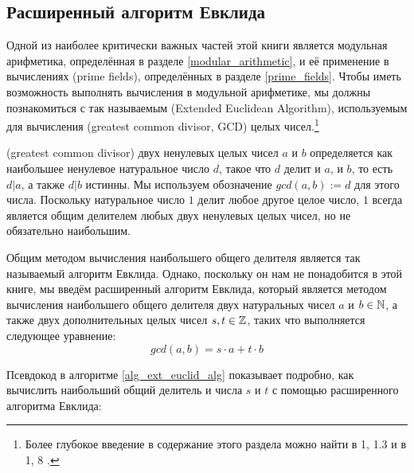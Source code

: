 \subsection{Расширенный алгоритм Евклида}
Одной из наиболее критически важных частей этой книги является модульная арифметика, определённая в разделе \ref{modular_arithmetic}, и её применение в вычислениях  (prime fields), определённых в разделе \ref{prime_fields}. Чтобы иметь возможность выполнять вычисления в модульной арифметике, мы должны познакомиться с так называемым  (Extended Euclidean Algorithm), используемым для вычисления  (greatest common divisor, GCD) целых чисел.\footnote{Более глубокое введение в содержание этого раздела можно найти в \chaptname{} 1, \secname{} 1.3 \cite{cohen-2010} и в \chaptname{} 1, \secname{} 8 \cite{mignotte-1992}.}

 (greatest common divisor) двух ненулевых целых чисел $a$ и $b$ определяется как наибольшее ненулевое натуральное число $d$, такое что $d$ делит и $a$, и $b$, то есть $d|a$, а также $d|b$ истинны. Мы используем обозначение $ gcd (a, b):=d $ для этого числа. Поскольку натуральное число $1$ делит любое другое целое число, $1$ всегда является общим делителем любых двух ненулевых целых чисел, но не обязательно наибольшим.

Общим методом вычисления наибольшего общего делителя является так называемый алгоритм Евклида. Однако, поскольку он нам не понадобится в этой книге, мы введём расширенный алгоритм Евклида, который является методом вычисления наибольшего общего делителя двух натуральных чисел $ a $ и $ b \in \mathbb{N} $, а также двух дополнительных целых чисел $ s, t \in \mathbb{Z} $, таких что выполняется следующее уравнение:
\begin{equation}
\label{eq: erw_Eukl_algo}
gcd (a, b) = s \cdot a + t \cdot b
\end{equation}

Псевдокод в алгоритме \ref{alg_ext_euclid_alg} показывает подробно, как вычислить наибольший общий делитель и числа $s$ и $t$ с помощью расширенного алгоритма Евклида:

